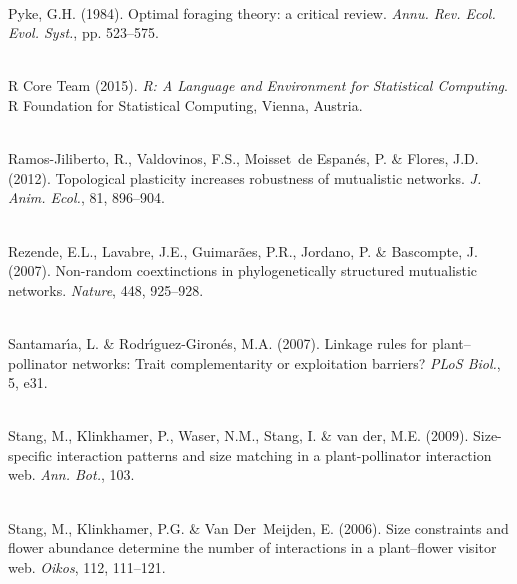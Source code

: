 \documentclass[12pt]{article}
\begin{document}
\begin{thebibliography}{67}
\hspace{0em}\\Pyke, G.H. (1984).
\newblock Optimal foraging theory: a critical review.
\newblock \emph{Annu. Rev. Ecol. Evol. Syst.}, pp. 523--575.

\hspace{0em}\\{R Core Team} (2015).
\newblock \emph{R: A Language and Environment for Statistical Computing}.
\newblock R Foundation for Statistical Computing, Vienna, Austria.

\hspace{0em}\\Ramos-Jiliberto, R., Valdovinos, F.S., Moisset~de Espan{\'e}s, P.
  \& Flores, J.D. (2012).
\newblock Topological plasticity increases robustness of mutualistic networks.
\newblock \emph{J. Anim. Ecol.}, 81, 896--904.

\hspace{0em}\\Rezende, E.L., Lavabre, J.E., Guimar{\~a}es, P.R., Jordano, P. \&
  Bascompte, J. (2007).
\newblock Non-random coextinctions in phylogenetically structured mutualistic
  networks.
\newblock \emph{Nature}, 448, 925--928.

\hspace{0em}\\Santamar{\'\i}a, L. \& Rodr{\'\i}guez-Giron{\'e}s, M.A. (2007).
\newblock Linkage rules for plant--pollinator networks: Trait complementarity
  or exploitation barriers?
\newblock \emph{PLoS Biol.}, 5, e31.

\hspace{0em}\\Stang, M., Klinkhamer, P., Waser, N.M., Stang, I. \& van der,
  M.E. (2009).
\newblock Size-specific interaction patterns and size matching in a
  plant-pollinator interaction web.
\newblock \emph{Ann. Bot.}, 103.

\hspace{0em}\\Stang, M., Klinkhamer, P.G. \& Van Der~Meijden, E. (2006).
\newblock Size constraints and flower abundance determine the number of
  interactions in a plant--flower visitor web.
\newblock \emph{Oikos}, 112, 111--121.


\end{thebibliography}
\end{document}
